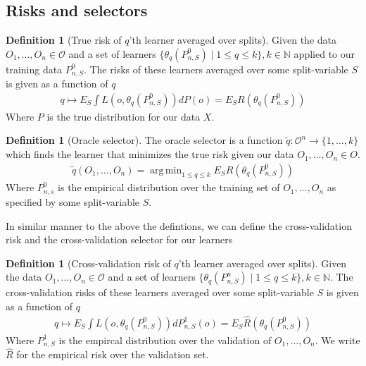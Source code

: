 \documentclass[11pt, a4paper]{article}
\DeclareMathOperator*{\argmin}{arg\,min}
\theoremstyle{definition}
\newtheorem{definition}[theorem]{Definition}
\theoremstyle{remark}
\newcommand{\cl}{q}
\begin{document}
\subsection{Risks and selectors}

\begin{definition}[True risk of $ \cl $'th learner averaged over splits]
    Given the data $ O_1, \ldots, O_n \in \mathcal{O} $ and a set of learners $ \{ \theta_{\cl}(P_{n, S}^{0}) \mid 1 \leq \cl \leq k \}, k \in \mathbb{N} $ applied to our training data $ P_{n, S}^{0} $. The risks of these learners averaged over some split-variable $ S $ is given as a function of $ \cl $ 
    \begin{align*}
        \cl \mapsto E_S \int L(o, \theta_{\cl}(P_{n,S}^{0}) ) dP(o) = E_S R( \theta_\cl(P_{n,S}^{0})) 
    \end{align*}
    Where $ P $ is the true distribution for our data $ X $.
\end{definition}

\begin{definition}[Oracle selector]
    The oracle selector is a function $ \tilde{\cl}: \mathcal{O}^{n} \to \{1,\ldots,k\} $  which finds the learner that minimizes the true risk given our data $ O_1 , \ldots , O_n \in O$. 
    \begin{align*}
        \tilde{\cl}(O_1 , \ldots, O_n) = \argmin_{1 \leq \cl \leq k} E_S R( \theta _\cl (P_{n,S}^0 )) 
    \end{align*}
    Where $ P_{n ,s}^{0} $ is the empirical distribution over the training set of $O_1 , \ldots, O_n $ as specified by some split-variable $ S $. 
\end{definition}
In similar manner to the above the defintions, we can define the cross-validation risk and the cross-validation selector for our learners 

\begin{definition}[Cross-validation risk of $ \cl $'th learner averaged over splits]
    Given the data $ O_1, \ldots, O_n \in \mathcal{O} $ and a set of learners $ \{ \theta_{\cl}(P_{n, S}^{n}) \mid 1 \leq \cl \leq k \}, k \in \mathbb{N} $. The cross-validation risks of these learners averaged over some split-variable $ S $ is given as a function of $ \cl $ 
    \begin{align*}
        \cl \mapsto E_S \int L(o, \theta_{\cl}(P_{n,S}^{0}) ) dP_{n, S}^{1}(o) = E_S \hat{R}( \theta_\cl(P_{n,S}^{0})) 
    \end{align*}
    Where $ P_{n,S}^{1} $ is the empircal distribution over the validation of $ O_1 , \dots, O_n $. We write $ \hat{R} $ for the empirical risk over the validation set. 
\end{definition}
\end{document}
